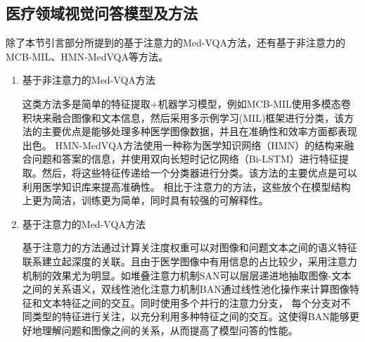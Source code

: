 \subsection{医疗领域视觉问答模型及方法}
除了本节引言部分所提到的基于注意力的Med-VQA方法，还有基于非注意力的MCB-MIL、HMN-MedVQA等方法。
\begin{enumerate}[topsep = 0 pt, itemsep= 0 pt, parsep=0pt, partopsep=0pt, leftmargin=0pt, itemindent=44pt, labelsep=6pt, listparindent=22pt, label=(\arabic*)]
    \item 基于非注意力的Med-VQA方法

    这类方法多是简单的特征提取+机器学习模型，例如MCB-MIL使用多模态卷积块来融合图像和文本信息，然后采用多示例学习(MIL)\cite{maron1997framework}框架进行分类，该方法的主要优点是能够处理多种医学图像数据，并且在准确性和效率方面都表现出色。
    HMN-MedVQA方法使用一种称为医学知识网络（HMN）的结构来融合问题和答案的信息，并使用双向长短时记忆网络（Bi-LSTM）进行特征提取。然后，将这些特征传递给一个分类器进行分类。该方法的主要优点是可以利用医学知识库来提高准确性。
    相比于注意力的方法，这些放个在模型结构上更为简洁，训练更为简单，同时具有较强的可解释性。
    \item 基于注意力的Med-VQA方法
    
    基于注意力的方法通过计算关注度权重可以对图像和问题文本之间的语义特征联系建立起深度的关联。且由于医学图像中有用信息的占比较少，采用注意力机制的效果尤为明显。如堆叠注意力机制SAN可以层层递进地抽取图像-文本之间的关系语义，双线性池化注意力机制BAN通过线性池化操作来计算图像特征和文本特征之间的交互\cite{kim2018bilinear}。同时使用多个并行的注意力分支，
    每个分支对不同类型的特征进行关注，以充分利用多种特征之间的交互。这使得BAN能够更好地理解问题和图像之间的关系，从而提高了模型问答的性能。
\end{enumerate}
